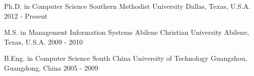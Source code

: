 

\begin{cventries}

  \cventry
    {Ph.D. in Computer Science} %
    {Southern Methodist University} %
    {Dallas, Texas, U.S.A.} %
    {2012 - Present} %
    {}

  \cventry
    {M.S. in Management Information Systems} %
    {Abilene Christian University} %
    {Abilene, Texas, U.S.A.} %
    {2009 - 2010} %
    {}

  \cventry
    {B.Eng. in Computer Science} %
    {South China University of Technology} %
    {Guangzhou, Guangdong, China} %
    {2005 - 2009} %
    {}

\end{cventries}
